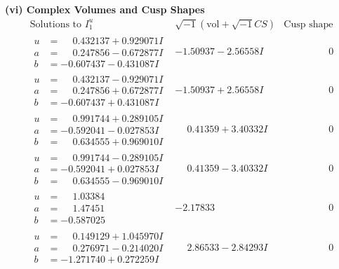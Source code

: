 \documentclass[1p]{elsarticle_modified}
\theoremstyle{definition}
\newcommand{\I}{\sqrt{-1}}
\begin{document}
\newpage\flushleft \textbf{(vi) Complex Volumes and Cusp Shapes}
$$\begin{array}{c|c|c}  
\text{Solutions to }I^u_{1}& \I (\text{vol} + \sqrt{-1}CS) & \text{Cusp shape}\\
 \hline 
\begin{aligned}
u &= \phantom{-}0.432137 + 0.929071 I \\
a &= \phantom{-}0.247856 - 0.672877 I \\
b &= -0.607437 - 0.431087 I\end{aligned}
 & -1.50937 - 2.56558 I & \phantom{-0.000000 } 0 \\ \hline\begin{aligned}
u &= \phantom{-}0.432137 - 0.929071 I \\
a &= \phantom{-}0.247856 + 0.672877 I \\
b &= -0.607437 + 0.431087 I\end{aligned}
 & -1.50937 + 2.56558 I & \phantom{-0.000000 } 0 \\ \hline\begin{aligned}
u &= \phantom{-}0.991744 + 0.289105 I \\
a &= -0.592041 - 0.027853 I \\
b &= \phantom{-}0.634555 + 0.969010 I\end{aligned}
 & \phantom{-}0.41359 + 3.40332 I & \phantom{-0.000000 } 0 \\ \hline\begin{aligned}
u &= \phantom{-}0.991744 - 0.289105 I \\
a &= -0.592041 + 0.027853 I \\
b &= \phantom{-}0.634555 - 0.969010 I\end{aligned}
 & \phantom{-}0.41359 - 3.40332 I & \phantom{-0.000000 } 0 \\ \hline\begin{aligned}
u &= \phantom{-}1.03384\phantom{ +0.000000I} \\
a &= \phantom{-}1.47451\phantom{ +0.000000I} \\
b &= -0.587025\phantom{ +0.000000I}\end{aligned}
 & -2.17833\phantom{ +0.000000I} & \phantom{-0.000000 } 0 \\ \hline\begin{aligned}
u &= \phantom{-}0.149129 + 1.045970 I \\
a &= \phantom{-}0.276971 - 0.214020 I \\
b &= -1.271740 + 0.272259 I\end{aligned}
 & \phantom{-}2.86533 - 2.84293 I & \phantom{-0.000000 } 0 \\ \hline\begin{aligned}

\end{aligned}
\end{array}$$
\end{document}
